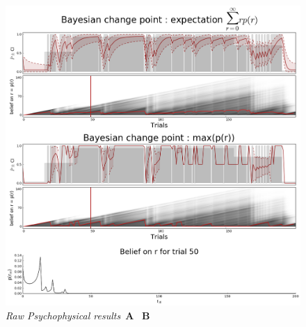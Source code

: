 \documentclass[profile,final,english, draft]{article}%
\begin{document}
\begin{figure}%

\begin{center} 
    \includegraphics[width=1\linewidth]{bayesianchangepoint}
\end{center}


\caption{\emph{Raw Psychophysical results}~\textbf{A} ~\textbf{B} 
}
\label{fig:results_raw}
\end{figure}
%
\end{document}
